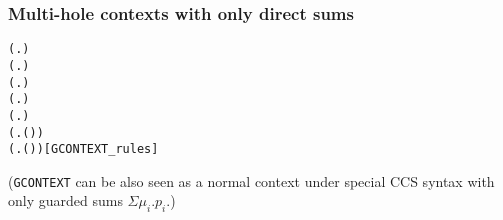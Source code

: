 \begin{frame}[fragile]
\frametitle{Multi-hole contexts with only direct sums}
\vspace{-2ex}
\begin{definition}
\begin{small}
\begin{alltt}
 (\HOLTokenLambda{}. )
 (\HOLTokenLambda{}. )
  \HOLSymConst{\HOLTokenImp{}}  (\HOLTokenLambda{}.  )
  \HOLSymConst{\HOLTokenConj{}}   \HOLSymConst{\HOLTokenImp{}}  (\HOLTokenLambda{}.   \HOLSymConst{\ensuremath{+}}  )
  \HOLSymConst{\HOLTokenConj{}}   \HOLSymConst{\HOLTokenImp{}}  (\HOLTokenLambda{}.   \HOLSymConst{\ensuremath{\parallel}}  )
  \HOLSymConst{\HOLTokenImp{}}  (\HOLTokenLambda{}. \HOLSymConst{\ensuremath{\nu}}  ( ))
  \HOLSymConst{\HOLTokenImp{}}  (\HOLTokenLambda{}.  ( ) )\hfill{[GCONTEXT_rules]}
\end{alltt}
\end{small}
\end{definition}
(\texttt{GCONTEXT} can be also seen as a normal context under special
CCS syntax with only guarded sums $\Sigma \mu_i.p_i$.)
\end{frame}

